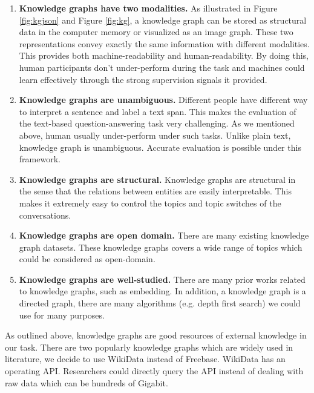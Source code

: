 \documentclass[bsc,frontabs,twoside,singlespacing,parskip,deptreport]{infthesis}     %
\begin{document}
\begin{enumerate}
   \item \textbf{Knowledge graphs have two modalities.} 
   As illustrated in Figure \ref{fig:kgjson} and Figure \ref{fig:kg}, a knowledge graph can be stored as structural data in the computer memory or visualized as an image graph. These two representations convey exactly the same information with different modalities. This provides both machine-readability and human-readability. By doing this, human participants don't under-perform during the task and machines could learn effectively through the strong supervision signals it provided.
   
   \item \textbf{Knowledge graphs are unambiguous.} Different people have different way to interpret a sentence and label a text span. This makes the evaluation of the text-based question-answering task very challenging. As we mentioned above, human usually under-perform under such tasks. Unlike plain text, knowledge graph is unambiguous. Accurate evaluation is possible under this framework.
   
   \item  \textbf{Knowledge graphs are structural.} Knowledge graphs are structural in the sense that the relations between entities are easily interpretable. This makes it extremely easy to control the topics and topic switches of the conversations.
   
    \item \textbf{Knowledge graphs are open domain.} There are many existing knowledge graph datasets\cite{vrandevcic2014wikidata,bollacker2008freebase}. These knowledge graphs covers a wide range of topics which could be considered as open-domain.
    
    \item \textbf{Knowledge graphs are well-studied.} There are many prior works related to knowledge graphs, such as embedding\cite{lin2015learning}. In addition, a knowledge graph is a directed graph, there are many algorithms (e.g. depth first search) we could use for many purposes.
    

\end{enumerate}


As outlined above, knowledge graphs are good resources of external knowledge in our task. There are two popularly knowledge graphs which are widely used in literature, we decide to use WikiData\cite{vrandevcic2014wikidata} instead of Freebase\cite{bollacker2008freebase}. WikiData has an operating API. Researchers could directly query the API instead of dealing with raw data which can be hundreds of Gigabit.
\end{document}
